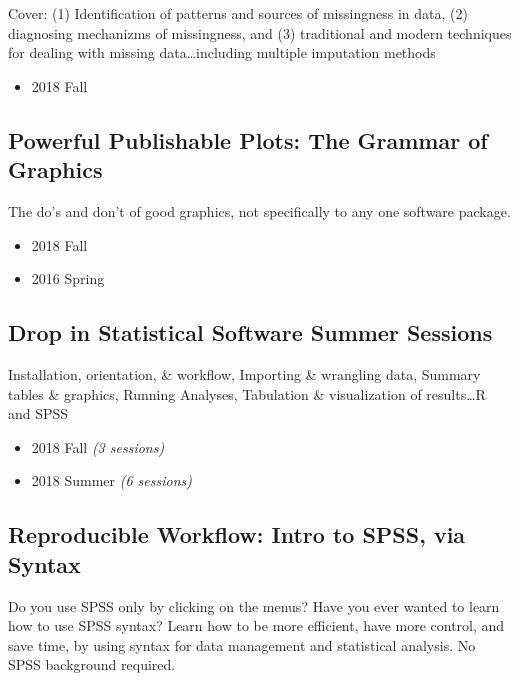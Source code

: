 \documentclass[11pt,a4paper,]{moderncv}
\providecommand{\tightlist}{%
	\setlength{\itemsep}{0pt}\setlength{\parskip}{0pt}}
\begin{document}
Cover: (1) Identification of patterns and sources of missingness in
data, (2) diagnosing mechanizms of missingness, and (3) traditional and
modern techniques for dealing with missing data\ldots including multiple
imputation methods

\begin{itemize}
\tightlist
\item
  2018 Fall
\end{itemize}

\hypertarget{powerful-publishable-plots-the-grammar-of-graphics}{%
\subsection{Powerful Publishable Plots: The Grammar of
Graphics}\label{powerful-publishable-plots-the-grammar-of-graphics}}

The do's and don't of good graphics, not specifically to any one
software package.

\begin{itemize}
\tightlist
\item
  2018 Fall
\item
  2016 Spring
\end{itemize}

\hypertarget{drop-in-statistical-software-summer-sessions}{%
\subsection{Drop in Statistical Software Summer
Sessions}\label{drop-in-statistical-software-summer-sessions}}

Installation, orientation, \& workflow, Importing \& wrangling data,
Summary tables \& graphics, Running Analyses, Tabulation \&
visualization of results\ldots R and SPSS

\begin{itemize}
\tightlist
\item
  2018 Fall \emph{(3 sessions)}
\item
  2018 Summer \emph{(6 sessions)}
\end{itemize}

\hypertarget{reproducible-workflow-intro-to-spss-via-syntax}{%
\subsection{Reproducible Workflow: Intro to SPSS, via
Syntax}\label{reproducible-workflow-intro-to-spss-via-syntax}}

Do you use SPSS only by clicking on the menus? Have you ever wanted to
learn how to use SPSS syntax? Learn how to be more efficient, have more
control, and save time, by using syntax for data management and
statistical analysis. No SPSS background required.
\end{document}
